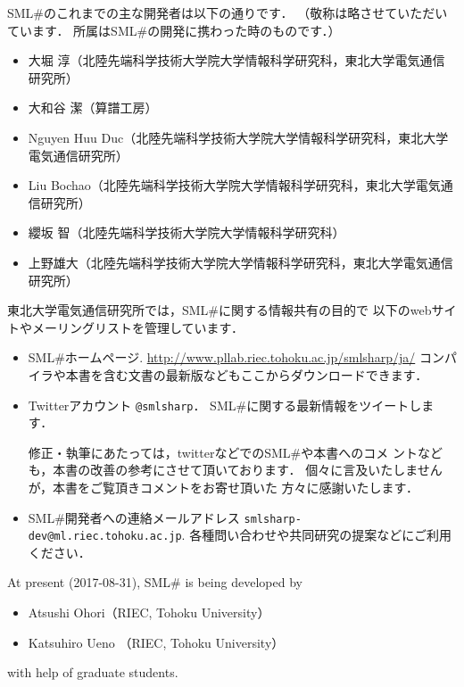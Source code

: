 \documentclass{jbook}
\newcommand{\smlsharp}{SML\#}
\newcommand{\releaseDate}{2017-08-31}
\begin{document}
	\smlsharp{}のこれまでの主な開発者は以下の通りです．
	（敬称は略させていただいています．
	所属は\smlsharp{}の開発に携わった時のものです．）
\begin{itemize}
\item 大堀 淳（北陸先端科学技術大学院大学情報科学研究科，東北大学電気通信研究所）
\item 大和谷 潔（算譜工房）
\item Nguyen Huu Duc（北陸先端科学技術大学院大学情報科学研究科，東北大学電気通信研究所）
\item Liu Bochao（北陸先端科学技術大学院大学情報科学研究科，東北大学電気通信研究所）
\item 纓坂 智（北陸先端科学技術大学院大学情報科学研究科）
\item 上野雄大（北陸先端科学技術大学院大学情報科学研究科，東北大学電気通信研究所）
\end{itemize}

	東北大学電気通信研究所では，\smlsharp{}に関する情報共有の目的で
以下のwebサイトやメーリングリストを管理しています．
\begin{itemize}
\item \smlsharp{}ホームページ.
\url{http://www.pllab.riec.tohoku.ac.jp/smlsharp/ja/}
コンパイラや本書を含む文書の最新版などもここからダウンロードできます．

\item Twitterアカウント {\tt @smlsharp}．
\smlsharp{}に関する最新情報をツイートします．

	修正・執筆にあたっては，twitterなどでの\smlsharp{}や本書へのコメ
ントなども，本書の改善の参考にさせて頂いております．
	個々に言及いたしませんが，本書をご覧頂きコメントをお寄せ頂いた
方々に感謝いたします． 

\item \smlsharp{}開発者への連絡メールアドレス
{\tt smlsharp-dev@ml.riec.tohoku.ac.jp}.
各種問い合わせや共同研究の提案などにご利用ください．

\end{itemize}
\else%
	At present (\releaseDate), \smlsharp{} is being developed by
\begin{itemize}
\item 
Atsushi Ohori（RIEC, Tohoku University）
\item 
Katsuhiro Ueno （RIEC, Tohoku University）
\end{itemize}
with help of graduate students.
\end{document}
